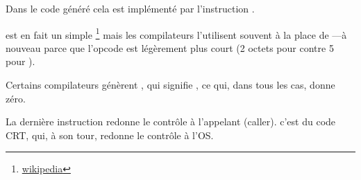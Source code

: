 Dans le code généré cela est implémenté par l'instruction .


\XOR est en fait un simple \footnote{\href{http://go.yurichev.com/17118}{wikipedia}} mais
les compilateurs l'utilisent souvent à la place de ---à nouveau parce que l'opcode est légèrement plus
court (2 octets pour \XOR contre 5 pour \MOV).

Certains compilateurs génèrent , qui signifie  \EAX {} \EAX,
 ce qui, dans tous les cas, donne zéro.

La dernière instruction \RET redonne le contrôle à l'appelant (\gls{caller}). c'est du code \CCpp \ac{CRT}, qui, à son tour, redonne le contrôle à l'\ac{OS}.

